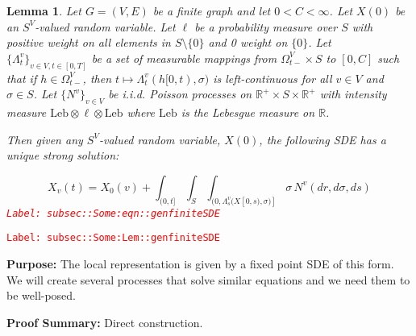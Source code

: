 \documentclass[12pt]{article}
\newcommand{\mb}{\mathbb}
\newcommand{\te}{\text}
\newcommand{\tr}{\textcolor{red}}
\newcommand{\labe}[1]{\tr{\texttt{Label: #1}}}
\newcommand{\purpose}{\textbf{Purpose: }}
\newcommand{\pfsum}{\textbf{Proof Summary: }}
\newcommand{\ind}{\hspace{24pt}}
\renewcommand{\v}{v}							%
\renewcommand{\S}{S}							%
\newcommand{\s}{\sigma}							%
\newcommand{\T}{T}								%
\renewcommand{\t}{t}							%
\newcommand{\sset}{\Omega}						%
\renewcommand{\tt}{s}							%
\newcommand{\X}{X}								%
\newcommand{\vind}[1]{^{#1}}					%
\newcommand{\carp}[1]{^{#1}}					%
\newcommand{\vsi}[1]{^{#1}}						%
\newcommand{\cind}[1]{_{#1}}					%
\newcommand{\tp}[1]{(#1)}						%
\newcommand{\tip}[1]{#1}						%
\newcommand{\ts}[1]{_{#1}}						%
\newcommand{\const}{C}							%
\newcommand{\poiss}{N}							%
\newcommand{\leb}{\te{Leb}}						%
\newcommand{\Sm}{\ell}							%
\renewcommand{\r}{r}							%
\newcommand{\ratee}{\Lambda}					%
\newtheorem{lem}[thms]{Lemma}
\begin{document}
\begin{lem}
Let \(G = (V,E)\) be a finite graph and let \(0 < \const< \infty\). Let \(\X\tp{0}\) be an \(\S\carp{V}\)-valued random variable. Let \(\Sm\) be a probability measure over \(\S\) with positive weight on all elements in \(\S\setminus\{0\}\) and 0 weight on \(\{0\}\). Let \(\{\ratee\ts{\t}\vind{\v}\}_{\v \in V,\t\in [0,\T]}\) be a set of measurable mappings from \(\sset\vsi{V}\ts{\t-} \times \S\) to \([0,\const]\) such that if \(h \in \sset\vsi{V}\ts{\t-}\), then \(\t\mapsto \ratee\ts{\t}\vind{\v}(h[0,\t),\s)\) is left-continuous for all \(\v \in V\) and \(\s \in \S\). Let \(\{\poiss\vind{\v}\}_{\v \in V}\) be i.i.d. Poisson processes on \(\mb{R}^+\times \S\times\mb{R}^+\) with intensity measure \(\leb\otimes\Sm\otimes\leb\) where \(\leb\) is the Lebesgue measure on \(\mb{R}\).

\ind Then given any \(\S\carp{V}\)-valued random variable, \(\X\tp{0}\), the following SDE has a unique strong solution:

\begin{equation}
\X\cind{\v}\tp{\t} = \X\cind{0}\tp{\v} + \int_{(0,\t]}\int_\S\int_{(0,\ratee\ts{\tt}\vind{\v}(\X\tip{[0,\tt)},\s)]}  \s\,\poiss\vind{\v}(d\r,d\s,d\tt)
\label{subsec::Some:eqn::genfiniteSDE}
\end{equation}
\labe{subsec::Some:eqn::genfiniteSDE}
\label{subsec::Some:Lem::genfiniteSDE}
\end{lem}
\labe{subsec::Some:Lem::genfiniteSDE}

\purpose The local representation is given by a fixed point SDE of this form. We will create several processes that solve similar equations and we need them to be well-posed.

\pfsum Direct construction.
\end{document}
